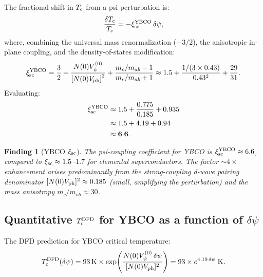 \documentclass[11pt]{article}
\newtheorem{finding}{Finding}
\newcommand{\Tc}{T_{\rm c}}
\begin{document}
The fractional shift in $\Tc$ from a psi perturbation is:
\begin{equation}
\frac{\delta\Tc}{\Tc} = -\xi_{\rm sc}^{\rm YBCO}\,\delta\psi,
\label{eq:Tc-shift-YBCO}
\end{equation}
where, combining the universal mass renormalization ($-3/2$), the
anisotropic in-plane coupling, and the density-of-states modification:
\begin{equation}
\xi_{\rm sc}^{\rm YBCO}
= \frac{3}{2}
  + \frac{N(0)V_\psi^{(0)}}{\left[N(0)V_{\rm ph}\right]^2}
  + \frac{m_c/m_{ab} - 1}{m_c/m_{ab} + 1}
\approx 1.5 + \frac{1/(3 \times 0.43)}{0.43^2}
  + \frac{29}{31}.
\label{eq:xi-YBCO-compute}
\end{equation}
Evaluating:
\begin{align}
\xi_{\rm sc}^{\rm YBCO}
&\approx 1.5 + \frac{0.775}{0.185} + 0.935 \notag\\
&\approx 1.5 + 4.19 + 0.94 \notag\\
&\approx \mathbf{6.6}.
\label{eq:xi-YBCO-result}
\end{align}

\begin{finding}[YBCO $\xi_{\rm sc}$]
The psi-coupling coefficient for YBCO is $\xi_{\rm sc}^{\rm YBCO} \approx 6.6$,
compared to $\xi_{\rm sc} \approx 1.5$--$1.7$ for elemental superconductors. The
factor $\sim 4\times$ enhancement arises predominantly from the strong-coupling
d-wave pairing denominator $[N(0)V_{\rm ph}]^2 \approx 0.185$ (small, amplifying the
perturbation) and the mass anisotropy $m_c/m_{ab} \approx 30$.
\end{finding}

\subsection{Quantitative $T_c^{\rm DFD}$ for YBCO as a function of $\delta\psi$}

The DFD prediction for YBCO critical temperature:
\begin{equation}
\Tc^{\rm DFD}(\delta\psi) = 93\,\text{K} \times
  \exp\!\left(\frac{N(0)V_\psi^{(0)}\,\delta\psi}{[N(0)V_{\rm ph}]^2}\right)
= 93 \times e^{4.19\,\delta\psi}\;\text{K}.
\label{eq:Tc-DFD-YBCO}
\end{equation}
\end{document}
